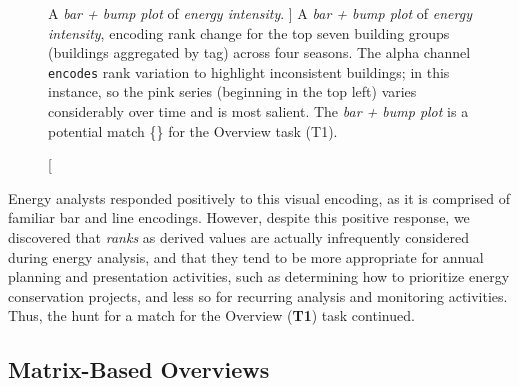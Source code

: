
\begin{figure}
	\centering
	\caption
	[
	    A \textsl{bar + bump plot} of \textsl{energy intensity}.
	]
	{
	    A \textsl{bar + bump plot} of \textsl{energy intensity}, encoding rank change for the top seven building groups (buildings aggregated by tag) across four seasons. The alpha channel {\tt encodes} rank variation to highlight inconsistent buildings; in this instance, so the pink series (beginning in the top left) varies considerably over time and is most salient. The \textsl{bar + bump plot} is a potential match  \{\posmatch\} for the Overview task (T1).
	}
	\centering
	\label{emu:fig:sandbox-barbump}
\end{figure}


Energy analysts responded positively to this visual encoding, as it is comprised of familiar bar and line encodings. 
However, despite this positive response, we discovered that {\it ranks} as derived values are actually infrequently considered during energy analysis, and that they tend to be more appropriate for annual planning and presentation activities, such as determining how to prioritize energy conservation projects, and less so for recurring analysis and monitoring activities.
Thus, the hunt for a match for the Overview ({\bf T1}) task continued.


\subsection{Matrix-Based Overviews}
\label{emu:design-matrix}


